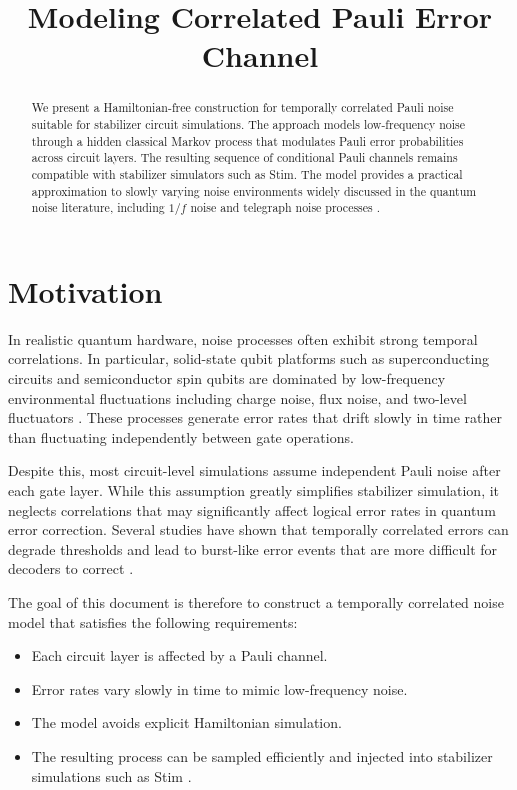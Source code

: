 \documentclass[11pt]{article}
\title{\bf Modeling Correlated Pauli Error Channel}
\date{}
\begin{document}
\maketitle

\begin{abstract}
We present a Hamiltonian-free construction for temporally correlated Pauli noise suitable for stabilizer circuit simulations. 
The approach models low-frequency noise through a hidden classical Markov process that modulates Pauli error probabilities across circuit layers. 
The resulting sequence of conditional Pauli channels remains compatible with stabilizer simulators such as Stim. 
The model provides a practical approximation to slowly varying noise environments widely discussed in the quantum noise literature, including $1/f$ noise and telegraph noise processes \cite{paladino2014}.
\end{abstract}

\section{Motivation}

In realistic quantum hardware, noise processes often exhibit strong temporal correlations. 
In particular, solid-state qubit platforms such as superconducting circuits and semiconductor spin qubits are dominated by low-frequency environmental fluctuations including charge noise, flux noise, and two-level fluctuators \cite{paladino2014}. 
These processes generate error rates that drift slowly in time rather than fluctuating independently between gate operations.

Despite this, most circuit-level simulations assume independent Pauli noise after each gate layer. 
While this assumption greatly simplifies stabilizer simulation, it neglects correlations that may significantly affect logical error rates in quantum error correction. 
Several studies have shown that temporally correlated errors can degrade thresholds and lead to burst-like error events that are more difficult for decoders to correct \cite{novais2007,ball2016}.

The goal of this document is therefore to construct a temporally correlated noise model that satisfies the following requirements:

\begin{itemize}
\item Each circuit layer is affected by a Pauli channel.
\item Error rates vary slowly in time to mimic low-frequency noise.
\item The model avoids explicit Hamiltonian simulation.
\item The resulting process can be sampled efficiently and injected into stabilizer simulations such as Stim \cite{gidney2021}.
\end{itemize}
\end{document}
